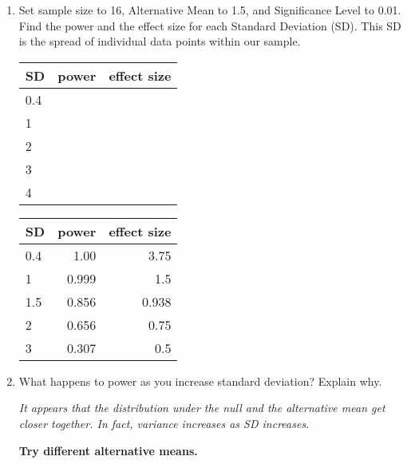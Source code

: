 \begin{enumerate}
  \item  Set sample size to 16, Alternative Mean to 1.5, and
    Significance Level to 0.01. Find the power and the effect size for
    each Standard Deviation (SD). This SD is the spread of individual
    data points within our sample.\\ 
\begin{students}
  \begin{tabular}{ |l|r|r|}\hline
    SD & power& effect size\\ \hline
    {\large 0.4} && \\ \hline
    {\large 1} &&\\ \hline
    {\large 2} &&\\ \hline
    {\large 3} &&\\ \hline
    {\large 4} &&\\ \hline
  \end{tabular}
\end{students}

\begin{key}
  \begin{tabular}{ |l|r|r|}\hline
     SD & power& effect size\\ \hline
    {\large 0.4}&1.00& 3.75\\ \hline
    {\large 1}  &0.999&1.5\\ \hline
    {\large 1.5}&0.856&0.938\\ \hline
    {\large 2}  &0.656&0.75\\ \hline
    {\large 3}  &0.307&0.5\\ \hline
  \end{tabular}
\end{key}
\item      What happens to power as you increase standard deviation? Explain why.
\begin{students}
\vspace{2cm} %
\end{students}

\begin{key}
  {\it It appears that the distribution under the null and the
    alternative mean get closer together.  In fact, variance increases
    as SD increases. }
\end{key}


\begin{center}
  {\bf Try different alternative means.}
\end{center}


\end{enumerate}
